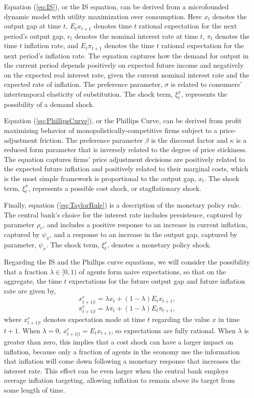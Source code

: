 \documentclass[12pt]{article}
\begin{document}
Equation (\ref{eq:IS}), or the IS equation, can be derived from a microfounded dynamic model with utility maximization over consumption. Here $x_t$ denotes the output gap at time $t$, $E_t x_{t+1}$ denotes time $t$ rational expectation for the next period's output gap, $r_t$ denotes the nominal interest rate at time $t$, $\pi_t$ denotes the time $t$ inflation rate, and  $E_t \pi_{t+1}$ denotes the time $t$ rational expectation for the next period's inflation rate. The equation captures how the demand for output in the current period depends positively on expected future income and negatively on the expected real interest rate, given the current nominal interest rate and the expected rate of inflation. The preference parameter, $\sigma$ is related to consumers' intertemporal elasticity of substitution. The shock term, $\xi_t^x$, represents the possibility of a demand shock.

Equation (\ref{eq:PhillipsCurve}), or the Phillips Curve, can be derived from profit maximizing behavior of monopolistically-competitive firms subject to a price-adjustment friction. The preference parameter $\beta$ is the discount factor and $\kappa$ is a reduced form parameter that is inversely related to the degree of price stickiness. The equation captures firms' price adjustment decisions are positively related to the expected future inflation and positively related to their marginal costs, which is the most simple framework is proportional to the output gap, $x_t$. The shock term, $\xi_t^\pi$, represents a possible cost shock, or stagflationary shock.

Finally, equation (\ref{eq:TaylorRule}) is a description of the monetary policy rule. The central bank's choice for the interest rate includes persistence, captured by parameter $\rho_r$, and includes a positive response to an increase in current inflation, captured by $\psi_\pi$, and a response to an increase in the output gap, captured by parameter, $\psi_x$. The shock term, $\xi_t^r$, denotes a monetary policy shock.

Regarding the IS and the Phillips curve equations, we will consider the possibility that a fraction $\lambda \in [0,1)$ of agents form naive expectations, so that on the aggregate, the time $t$ expectations for the future output gap and future inflation rate are given by,
\begin{equation}\label{eq:xe}
  x_{t+1|t}^e = \lambda x_t + (1-\lambda) E_t x_{t+1},
\end{equation}
\begin{equation}\label{eq:pie}
  \pi_{t+1|t}^e = \lambda \pi_t + (1-\lambda) E_t \pi_{t+1},
\end{equation}
where $x_{t+1|t}^e$ denotes expectation made at time $t$ regarding the value $x$ in time $t+1$. When $\lambda=0$, $x_{t+1|t}^e = E_t x_{t+1}$, so expectations are fully rational. When $\lambda$ is greater than zero, this implies that a cost shock can have a larger impact on inflation, because only a fraction of agents in the economy use the information that inflation will come down following a monetary response that increases the interest rate. This effect can be even larger when the central bank employs average inflation targeting, allowing inflation to remain above its target from some length of time.
\end{document}
